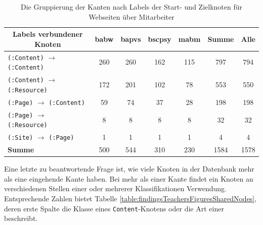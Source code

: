     \begin{table}[htb]
        \centering
        \begin{tabular}{|l|c|c|c|c|c|c|}
            \hline
            \multicolumn{1}{|c|}{\textbf{Labels verbundener Knoten}} & \textbf{\gls{babw}} & \textbf{\gls{bapvs}} & \textbf{\gls{bscpsy}} & \textbf{\gls{mabm}} & \textbf{Summe} & \textbf{Alle} \\ \hline
            \texttt{(:Content)} $\rightarrow$ \texttt{(:Content)}                           & 260           & 260            & 162             & 115           & 797            & 794           \\ \hline
            \texttt{(:Content)} $\rightarrow$ \texttt{(:Resource)}                         & 172           & 201            & 102             & 78            & 553            & 550           \\ \hline
            \texttt{(:Page)} $\rightarrow$ \texttt{(:Content)}                              & 59            & 74             & 37              & 28            & 198            & 198           \\ \hline
            \texttt{(:Page)} $\rightarrow$ \texttt{(:Resource)}                             & 8             & 8              & 8               & 8             & 32             & 32            \\ \hline
            \texttt{(:Site)} $\rightarrow$ \texttt{(:Page)}                                 & 1             & 1              & 1               & 1             & 4              & 4             \\ \hline
            \hline
            \textbf{Summe}                                          & 500           & 544            & 310             & 230           & 1584           & 1578          \\ \hline
        \end{tabular}
        \caption{Die Gruppierung der Kanten nach Labels der Start- und Zielknoten für Webseiten über Mitarbeiter}
        \label{table:findingsTeachersFiguresEdgesByStartEndNodeLabel}
    \end{table}

    Eine letzte zu beantwortende Frage ist,
    wie viele Knoten in der Datenbank mehr als eine eingehende Kante haben.
    Bei mehr als einer Kante findet ein Knoten an verschiedenen Stellen 
    einer oder mehrerer Klassifikationen Verwendung.
    Entsprechende Zahlen bietet Tabelle \ref{table:findingsTeachersFiguresSharedNodes},
    deren erste Spalte die Klasse eines \texttt{Content}-Knotens oder
    die Art einer {\resource} beschreibt.

